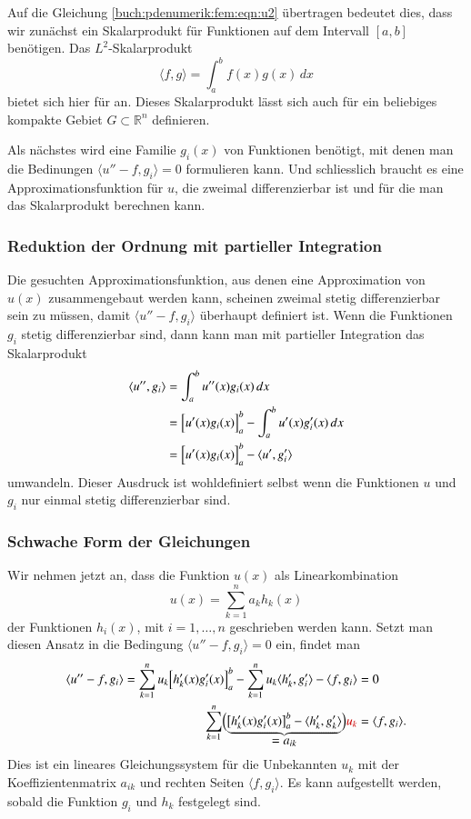 Auf die Gleichung \eqref{buch:pdenumerik:fem:eqn:u2} übertragen
bedeutet dies, dass wir zunächst ein Skalarprodukt für Funktionen
auf dem Intervall $[a,b]$ benötigen.
Das $L^2$-Skalarprodukt
\[
\langle f,g\rangle
=
\int_a^b f(x)g(x)\,dx
\]
bietet sich hier für an.
Dieses Skalarprodukt lässt sich auch für
ein beliebiges kompakte Gebiet $G\subset\mathbb{R}^n$ definieren.

Als nächstes wird eine Familie $g_i(x)$ von Funktionen benötigt, mit
denen man die Bedinungen $\langle u''-f,g_i\rangle=0$
formulieren kann.
Und schliesslich braucht es eine Approximationsfunktion für $u$, die zweimal
differenzierbar ist und für die man das Skalarprodukt berechnen kann.

%
%
\subsubsection{Reduktion der Ordnung mit partieller Integration}
Die gesuchten Approximationsfunktion, aus denen eine Approximation von
$u(x)$ zusammengebaut werden kann, scheinen zweimal stetig differenzierbar
sein zu müssen, damit $\langle u''-f,g_i\rangle$ überhaupt definiert ist.
Wenn die Funktionen $g_i$ stetig differenzierbar sind, dann kann man
mit partieller Integration das Skalarprodukt
\begin{align*}
\langle u'',g_i \rangle
&=
\int_a^b u''(x)g_i(x)\,dx
\\
&=
\Bigl[ u'(x) g_i(x) \Bigr]_a^b
-
\int_a^b u'(x) g'_i(x)\,dx
\\
&=
\Bigl[ u'(x) g_i(x)\Bigr]_a^b
-
\langle u', g'_i\rangle
\end{align*}
umwandeln.
Dieser Ausdruck ist wohldefiniert selbst wenn die Funktionen $u$ und $g_i$
nur einmal stetig differenzierbar sind.

%
%
\subsubsection{Schwache Form der Gleichungen}
Wir nehmen jetzt an, dass die Funktion $u(x)$ als Linearkombination
\[
u(x) 
=
\sum_{k=1}^n a_k h_k(x)
\]
der Funktionen $h_i(x)$, mit $i=1,\dots,n$ geschrieben werden kann.
Setzt man diesen Ansatz in die Bedingung $\langle u''-f,g_i\rangle=0$ ein,
findet man
\begin{align}
\langle u''-f,g_i\rangle
=
\sum_{k=1}^n
u_k
\Bigl[h'_k(x) g'_i(x)\Bigr]_a^b
-
\sum_{k=1}^n
u_k
\langle h'_k,g'_i\rangle
-
\langle f,g_i\rangle
&=
0
\notag
\\
\sum_{k=1}^n
\Bigl(
\underbrace{
\bigl[h'_k(x)g'_i(x)\bigr]_a^b
-
\langle h'_k,g'_k\rangle
}_{\displaystyle =  a_{ik}}
\Bigr)
{\color{darkred}u_k}
&=
\langle f,g_i\rangle.
\label{buch:pdenumerik:fem:eqn:gleichungen}
\end{align}
Dies ist ein lineares Gleichungssystem für die Unbekannten $u_k$
mit der Koeffizientenmatrix $a_{ik}$ und rechten Seiten
$\langle f,g_i\rangle$.
Es kann aufgestellt werden, sobald die Funktion $g_i$ und $h_k$ festgelegt
sind.

